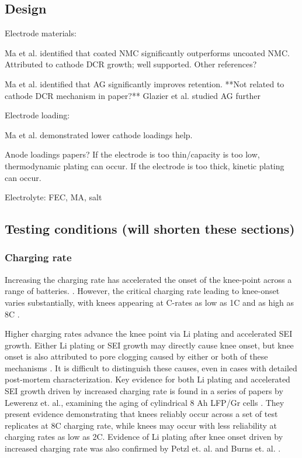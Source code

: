 \documentclass{article}
\begin{document}
\subsection{Design}

Electrode materials:

Ma et al.\cite{ma_editors_2019} identified that coated NMC significantly outperforms uncoated NMC.
Attributed to cathode DCR growth; well supported.
Other references?

Ma et al.\cite{ma_editors_2019} identified that AG significantly improves retention.
**Not related to cathode DCR mechanism in paper?**
Glazier et al. studied AG further


Electrode loading:

Ma et al.\cite{ma_editors_2019} demonstrated lower cathode loadings help.

Anode loadings papers?
If the electrode is too thin/capacity is too low, thermodynamic plating can occur.
If the electrode is too thick, kinetic plating can occur.


Electrolyte: FEC, MA, salt


\subsection{Testing conditions (will shorten these sections)}

\subsubsection{Charging rate}
Increasing the charging rate has accelerated the onset of the knee-point across a range of batteries. \cite{lewerenz_systematic_2017,lewerenz_post-mortem_2017, petzl_lithium_2015, burns_-situ_2015, waldmann_optimization_2015, schuster_nonlinear_2015, severson_data-driven_2019, schindler_fast_2018, keil_linear_2019}. However, the critical charging rate leading to knee-onset varies substantially, with knees appearing at C-rates as low as 1C \cite{waldmann_optimization_2015} and as high as 8C \cite{lewerenz_systematic_2017}. 

Higher charging rates advance the knee point via Li plating and accelerated SEI growth. Either Li plating or SEI growth may directly cause knee onset, but knee onset is also attributed to pore clogging caused by either or both of these mechanisms \cite{yang_modeling_2017}. It is difficult to distinguish these causes, even in cases with detailed post-mortem characterization. Key evidence for both Li plating and accelerated SEI growth driven by increased charging rate is found in a series of papers by Lewerenz et. al., examining the aging of cylindrical 8 Ah LFP/Gr cells \cite{lewerenz_systematic_2017,lewerenz_post-mortem_2017}. They present evidence demonstrating that knees reliably occur across a set of test replicates at 8C charging rate, while knees may occur with less reliability at charging rates as low as 2C. Evidence of Li plating after knee onset driven by increased charging rate was also confirmed by Petzl et. al. \cite{petzl_lithium_2015} and Burns et. al. \cite{burns_-situ_2015}. 
\end{document}
